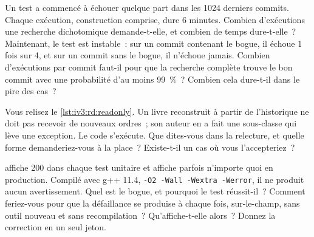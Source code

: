 \begin{question}\label{iq:iv3:reading-debugging-and-software-design:28}
Un test a commencé à échouer quelque part dans les 1024 derniers commits. Chaque exécution, construction comprise, dure 6 minutes. Combien d'exécutions une recherche dichotomique demande-t-elle, et combien de temps dure-t-elle~? Maintenant, le test est instable~: sur un commit contenant le bogue, il échoue 1 fois sur 4, et sur un commit sans le bogue, il n'échoue jamais. Combien d'exécutions par commit faut-il pour que la recherche complète trouve le bon commit avec une probabilité d'au moins 99~\%~? Combien cela dure-t-il dans le pire des cas~?
\end{question}

\begin{question}\label{iq:iv3:reading-debugging-and-software-design:29}
Vous relisez le \cref{lst:iv3:rd:readonly}. Un livre reconstruit à partir de l'historique ne doit pas recevoir de nouveaux ordres~; son auteur en a fait une sous-classe qui lève une exception. Le code s'exécute. Que dites-vous dans la relecture, et quelle forme demanderiez-vous à la place~? Existe-t-il un cas où vous l'accepteriez~?
\label{lst:iv3:rd:readonly}
\end{question}

\begin{question}\label{iq:iv3:reading-debugging-and-software-design:30}
 affiche 200 dans chaque test unitaire et affiche parfois n'importe quoi en production. Compilé avec g++ 11.4, \texttt{-O2 -Wall -Wextra -Werror}, il ne produit aucun avertissement. Quel est le bogue, et pourquoi le test réussit-il~? Comment feriez-vous pour que la défaillance se produise à chaque fois, sur-le-champ, sans outil nouveau et sans recompilation~? Qu'affiche-t-elle alors~? Donnez la correction en un seul jeton.
\label{lst:iv3:rd:uninit}
\end{question}

